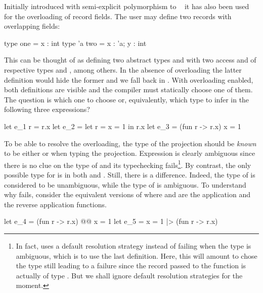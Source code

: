 \documentclass[acmsmall,screen,nonacm]{acmart}
\begin{document}
Initially introduced with semi-explicit polymorphism to \ML~\cite
{Garrigue-Remy/poly-ml} it has also been used for the overloading of record
fields. The user may define two records with overlapping fields:
\begin{program}[input]
type one = {x : int}
type 'a two = {x : 'a; y : int}
\end{program}
This can be thought of as defining two abstract types  and
 with two access  and  of
respective types  and , among
others.
%
In the absence of overloading the latter definition would hide the former
and we fall back in \ML. With overloading enabled, both definitions are
visible and the compiler must statically choose one of them.
%
The question is which one to choose or, equivalently, which type to infer
in the following three expressions? 
\begin{program}[input]
let e_1 r = r.x
let e_2 = let r = {x = 1} in r.x
let e_3 = (fun r -> r.x) {x = 1} 
\end{program}
To be able to resolve the overloading, the type of the projection should be
\emph{known} to be either  or  when typing the
projection.  Expression  is clearly ambiguous since
there is no clue on the type of  and its typechecking
fails\footnote {In fact, \OCaml uses a default resolution strategy instead
of failing when the type is ambiguous, which is to use the last
definition. Here, this will amount to chose the type 
still leading to a failure since the record passed to the function is
actually of type . But we shall ignore default resolution
strategies for the moment.}.
%
By contrast, the only possible
type for  is  in both  and .
Still, there is a difference.  Indeed, the type of  is considered
to be unambiguous, while the type of  is ambiguous. To
understand why  fails, consider the equivalent versions of
 where  and \ocaml{|>} are the application and the
reverse application functions.
\begin{program}[escapechar={},input]
let e_4 = (fun r -> r.x) @@ {x = 1} 
let e_5 = {x = 1} |> (fun r -> r.x) 
\end{program}
\end{document}
